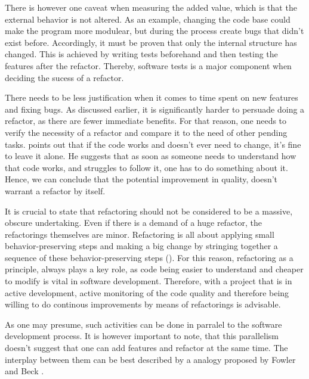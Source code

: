 There is however one caveat when measuring the added value,
	which is that the external behavior is not altered. 
As an example, changing the code base could make the program more modulear, 
	but during the process create bugs that didn't exist before. 
Accordingly, it must be proven that only the internal structure has changed.
This is achieved by writing tests beforehand and then testing the features after the refactor.
Thereby, software tests is a major component when deciding the sucess of a refactor.




There needs to be less justification when it comes to time spent on new features and fixing bugs.
As discussed earlier, it is significantly harder to persuade doing a refactor, 
	as there are fewer immediate benefits.
For that reason, one needs to verify the necessity of a refactor 
	and compare it to the need of other pending tasks.
\textcite[p.~5]{fowler2018} points out that if the code works and doesn't ever need to change, 
	it's fine to leave it alone.
He suggests that as soon as someone needs to understand how that code works, 
	and struggles to follow it, one has to do something about it.
Hence, we can conclude that the potential improvement in quality, doesn't warrant a refactor by itself.

It is crucial to state that refactoring should not be considered to be a massive, obscure undertaking.
Even if there is a demand of a huge refactor, the refactorings themselves are minor.
Refactoring is all about applying small behavior-preserving steps and making a big change by stringing together a sequence of these behavior-preserving steps (\cite[p.~45]{fowler2018}). 
For this reason, refactoring as a principle, 
	always plays a key role, 
	as code being easier to understand and cheaper to modify is vital in software development.
Therefore, with a project that is in active development, 
	active monitoring of the code quality and therefore being willing to do continous improvements 
	by means of refactorings is advisable.

As one may presume, such activities can be done in parralel to the software development process.
It is however important to note, 
	that this parallelism doesn't suggest that one can add features and refactor at the same time.
The interplay between them can be best described by a analogy proposed by Fowler and Beck \textcite[p.~47]{fowler2018}. 

